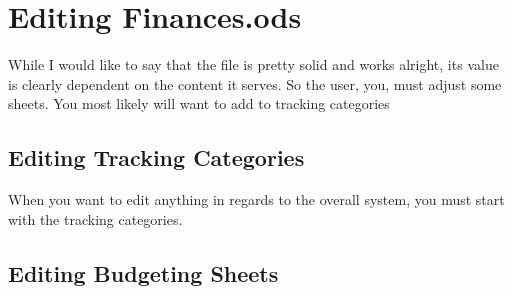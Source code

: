 \section{Editing Finances.ods}
\label{sec:editing-finances.ods}

While I would like to say that the file is pretty solid and works alright, its  value is clearly dependent on the content it serves.
So the user, you, must adjust some sheets.
You most likely will want to add to tracking categories

\subsection{Editing Tracking Categories}
\label{subsec:editing-tracking-categories}

When you want to edit anything in regards to the overall system, you must start with the tracking categories.

\subsection{Editing Budgeting Sheets}
\label{subsec:editing-budgeting-sheets}